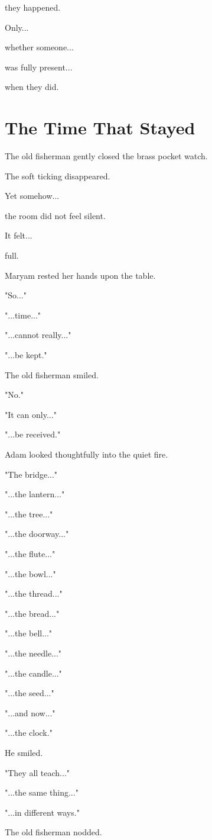 \documentclass[12pt,openany]{book}
\begin{document}
they happened.

Only...

whether someone...

was fully present...

when they did.
\section*{The Time That Stayed}

The old fisherman gently closed the brass pocket watch.

The soft ticking disappeared.

Yet somehow...

the room did not feel silent.

It felt...

full.

Maryam rested her hands upon the table.

"So..."

"...time..."

"...cannot really..."

"...be kept."

The old fisherman smiled.

"No."

"It can only..."

"...be received."

Adam looked thoughtfully into the quiet fire.

"The bridge..."

"...the lantern..."

"...the tree..."

"...the doorway..."

"...the flute..."

"...the bowl..."

"...the thread..."

"...the bread..."

"...the bell..."

"...the needle..."

"...the candle..."

"...the seed..."

"...and now..."

"...the clock."

He smiled.

"They all teach..."

"...the same thing..."

"...in different ways."

The old fisherman nodded.
\end{document}
